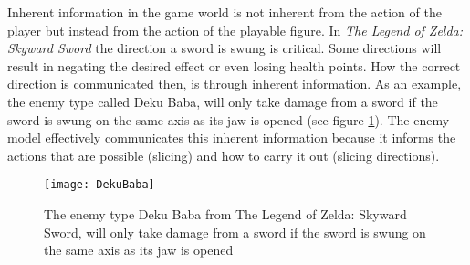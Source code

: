 Inherent information in the game world is not inherent from the action of the player but instead from the action of the playable figure. In \textit{The Legend of Zelda: Skyward Sword} \cite{skyward} the direction a sword is swung is critical. Some directions will result in negating the desired effect or even losing health points. How the correct direction is communicated then, is through inherent information. As an example, the enemy type called Deku Baba, will only take damage from a sword if the sword is swung on the same axis as its jaw is opened (see figure \ref{dekubaba}). The enemy model effectively communicates this inherent information because it informs the actions that are possible (slicing) and how to carry it out (slicing directions).

\begin{figure}[h]
  \texttt{[image: DekuBaba]}
  \caption{The enemy type Deku Baba from The Legend of Zelda: Skyward Sword, will only take damage from a sword if the sword is swung on the same axis as its jaw is opened}
  \label{dekubaba}
\end{figure}

